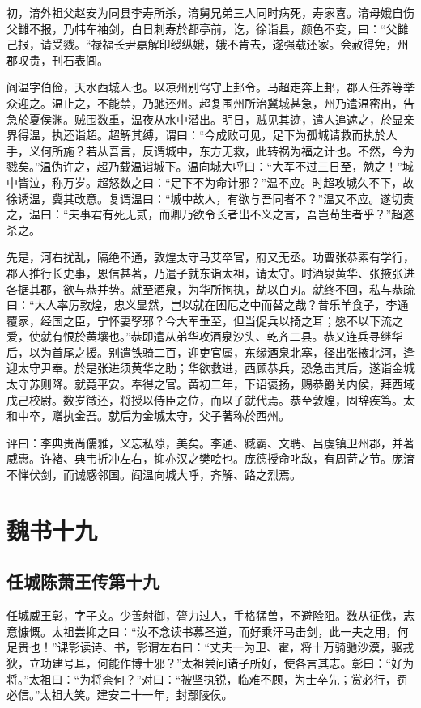 \documentclass[12pt,UTF8]{ctexbook}
\begin{document}
初，淯外祖父赵安为同县李寿所杀，淯舅兄弟三人同时病死，寿家喜。淯母娥自伤父雠不报，乃帏车袖剑，白日刺寿於都亭前，讫，徐诣县，颜色不变，曰：“父雠己报，请受戮。“禄福长尹嘉解印绶纵娥，娥不肯去，遂强载还家。会赦得免，州郡叹贵，刊石表闾。

阎温字伯俭，天水西城人也。以凉州别驾守上邽令。马超走奔上邽，郡人任养等举众迎之。温止之，不能禁，乃驰还州。超复围州所治冀城甚急，州乃遣温密出，告急於夏侯渊。贼围数重，温夜从水中潜出。明日，贼见其迹，遣人追遮之，於显亲界得温，执还诣超。超解其缚，谓曰：“今成败可见，足下为孤城请救而执於人手，义何所施？若从吾言，反谓城中，东方无救，此转祸为福之计也。不然，今为戮矣。”温伪许之，超乃载温诣城下。温向城大呼曰：“大军不过三日至，勉之！”城中皆泣，称万岁。超怒数之曰：“足下不为命计邪？”温不应。时超攻城久不下，故徐诱温，冀其改意。复谓温曰：“城中故人，有欲与吾同者不？”温又不应。遂切责之，温曰：“夫事君有死无贰，而卿乃欲令长者出不义之言，吾岂苟生者乎？”超遂杀之。

先是，河右扰乱，隔绝不通，敦煌太守马艾卒官，府又无丞。功曹张恭素有学行，郡人推行长史事，恩信甚著，乃遣子就东诣太祖，请太守。时酒泉黄华、张掖张进各据其郡，欲与恭并势。就至酒泉，为华所拘执，劫以白刃。就终不回，私与恭疏曰：“大人率厉敦煌，忠义显然，岂以就在困厄之中而替之哉？昔乐羊食子，李通覆家，经国之臣，宁怀妻孥邪？今大军垂至，但当促兵以掎之耳；愿不以下流之爱，使就有恨於黄壤也。”恭即遣从弟华攻酒泉沙头、乾齐二县。恭又连兵寻继华后，以为首尾之援。别遣铁骑二百，迎吏官属，东缘酒泉北塞，径出张掖北河，逢迎太守尹奉。於是张进须黄华之助；华欲救进，西顾恭兵，恐急击其后，遂诣金城太守苏则降。就竟平安。奉得之官。黄初二年，下诏褒扬，赐恭爵关内侯，拜西域戊己校尉。数岁徵还，将授以侍臣之位，而以子就代焉。恭至敦煌，固辞疾笃。太和中卒，赠执金吾。就后为金城太守，父子著称於西州。

评曰：李典贵尚儒雅，义忘私隙，美矣。李通、臧霸、文聘、吕虔镇卫州郡，并著威惠。许褚、典韦折冲左右，抑亦汉之樊哙也。庞德授命叱敌，有周苛之节。庞淯不惮伏剑，而诚感邻国。阎温向城大呼，齐解、路之烈焉。

\part{魏书十九}
\chapter{任城陈萧王传第十九}

任城威王彰，字子文。少善射御，膂力过人，手格猛兽，不避险阻。数从征伐，志意慷慨。太祖尝抑之曰：“汝不念读书慕圣道，而好乘汗马击剑，此一夫之用，何足贵也！”课彰读诗、书，彰谓左右曰：“丈夫一为卫、霍，将十万骑驰沙漠，驱戎狄，立功建号耳，何能作博士邪？”太祖尝问诸子所好，使各言其志。彰曰：“好为将。”太祖曰：“为将柰何？”对曰：“被坚执锐，临难不顾，为士卒先；赏必行，罚必信。”太祖大笑。建安二十一年，封鄢陵侯。
\end{document}
